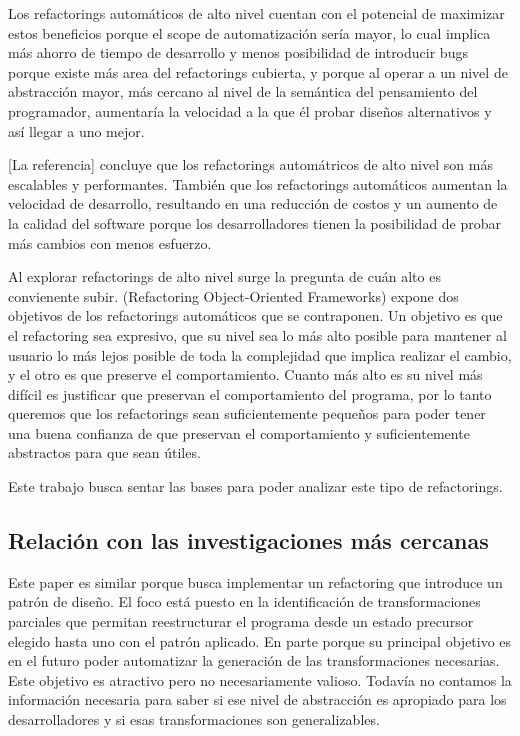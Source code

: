 \begin{description}
Los refactorings automáticos de alto nivel cuentan con el potencial de maximizar
estos beneficios porque el scope de automatización sería mayor, lo cual implica
más ahorro de tiempo de desarrollo y menos posibilidad de introducir bugs porque
existe más area del refactorings cubierta, y porque al operar a un nivel de
abstracción mayor, más cercano al nivel de la semántica del pensamiento del
programador, aumentaría la velocidad a la que él probar diseños alternativos y
así llegar a uno mejor.

[La referencia] concluye que los refactorings automátricos de alto nivel son más
escalables y performantes.  También que los refactorings automáticos aumentan la
velocidad de desarrollo, resultando en una reducción de costos y un aumento de
la calidad del software porque los desarrolladores tienen la posibilidad de
probar más cambios con menos esfuerzo.

Al explorar refactorings de alto nivel surge la pregunta de cuán alto es
convienente subir.
(Refactoring Object-Oriented Frameworks) expone dos objetivos de los
refactorings automáticos que se contraponen. Un objetivo es que el refactoring
sea expresivo, que su nivel sea lo más alto posible para mantener al usuario lo
más lejos posible de toda la complejidad que implica realizar el cambio, y el
otro es que preserve el comportamiento. Cuanto más alto es su nivel más difícil
es justificar que preservan el comportamiento del programa, por lo tanto
queremos que los refactorings sean suficientemente pequeños para poder tener una
buena confianza de que preservan el comportamiento y suficientemente abstractos
para que sean útiles.

Este trabajo busca sentar las bases para poder analizar este tipo de
refactorings.



\subsection{Relación con las investigaciones más cercanas}
Este paper es similar porque busca implementar un refactoring que introduce un
patrón de diseño. El foco está puesto en la identificación de transformaciones
parciales que permitan reestructurar el programa desde un estado precursor
elegido hasta uno con el patrón aplicado. En parte porque su principal objetivo
es en el futuro poder automatizar la generación de las transformaciones
necesarias. Este objetivo es atractivo pero no necesariamente valioso. Todavía
no contamos la información necesaria para saber si ese nivel de abstracción es
apropiado para los desarrolladores y si esas transformaciones son
generalizables.


\end{description}
